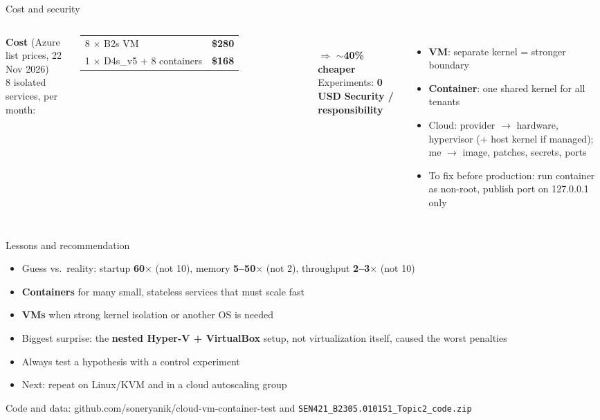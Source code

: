 \documentclass[aspectratio=169,11pt]{beamer}
\newcommand{\C}[1]{\textcolor{cont}{\textbf{#1}}}
\newcommand{\V}[1]{\textcolor{vm}{\textbf{#1}}}
\begin{document}
\begin{frame}{Cost and security}
	\begin{columns}[t]
		\textbf{Cost} (Azure list prices, 22 Nov 2026)\\[0.2cm]
		\small 8 isolated services, per month:\\[0.1cm]
		\begin{tabular}{lr}
			\toprule
			8 $\times$ B2s VM & \V{\$280} \\
			1 $\times$ D4s\_v5 + 8 containers & \C{\$168} \\
			\bottomrule
		\end{tabular}\\[0.2cm]
		$\Rightarrow$ $\sim$\textbf{40\% cheaper}\\
		Experiments: \textbf{0 USD}
		\textbf{Security / responsibility}\\[0.2cm]
		\small
		\begin{itemize}
			\item \V{VM}: separate kernel = stronger boundary
			\item \C{Container}: one shared kernel for all tenants
			\item Cloud: provider $\rightarrow$ hardware, hypervisor (+ host kernel if managed); me $\rightarrow$ image, patches, secrets, ports
			\item To fix before production: run container as non-root, publish port on 127.0.0.1 only
		\end{itemize}
	\end{columns}
\end{frame}

\begin{frame}{Lessons and recommendation}
	\begin{itemize}
		\item Guess vs.\ reality: startup \textbf{60$\times$} (not 10), memory \textbf{5--50$\times$} (not 2), throughput \textbf{2--3$\times$} (not 10)
		\item \C{Containers} for many small, stateless services that must scale fast
		\item \V{VMs} when strong kernel isolation or another OS is needed
		\item Biggest surprise: the \textbf{nested Hyper-V + VirtualBox} setup, not virtualization itself, caused the worst penalties
		\item Always test a hypothesis with a control experiment
		\item Next: repeat on Linux/KVM and in a cloud autoscaling group
	\end{itemize}
	\vfill
	\centering\small Code and data: github.com/soneryanik/cloud-vm-container-test \quad and \quad \texttt{SEN421\_B2305.010151\_Topic2\_code.zip}
\end{frame}
\end{document}
